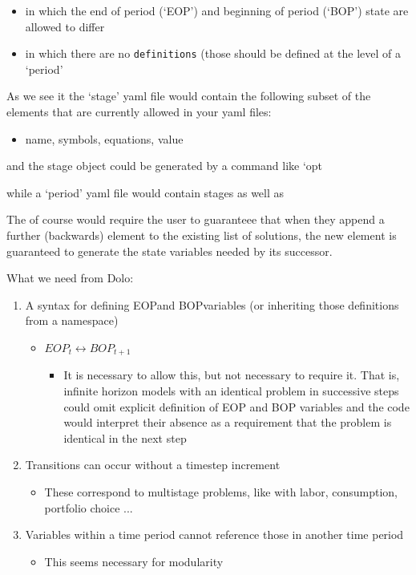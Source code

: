 \documentclass[\econtexRoot/BufferStockTheory]{subfiles}
\newcommand{\eop}{EOP}\newcommand{\bop}{BOP}
\begin{document}
\begin{itemize}
\item in which the end of period (`\eop') and beginning of period (`\bop') state are allowed to differ
\item in which there are no \texttt{definitions} (those should be defined at the level of a `period'
\end{itemize}


As we see it the `stage' yaml file would contain the following subset of the elements that are currently allowed in your yaml files:
\begin{itemize}
\item name, symbols, equations, value
  
\end{itemize}
and the stage object could be generated by a command like `opt

while a `period' yaml file would contain stages as well as 

The of course would require the user to guaranteee that when they append a further (backwards) element to the existing list of solutions, the new element is guaranteed to generate the state variables needed by its successor.

What we need from Dolo:
\begin{enumerate}
\item A syntax for defining \eop and \bop variables (or inheriting those definitions from a namespace)
  \begin{itemize}
  \item $\eop_{t} \leftrightarrow \bop_{t+1}$
    \begin{itemize}
    \item It is necessary to allow this, but not necessary to require it.  That is, infinite horizon models with an identical problem in successive steps could omit explicit definition of {\eop} and {\bop} variables and the code would interpret their absence as a requirement that the problem is identical in the next step
    \end{itemize}
  \end{itemize}
\item Transitions can occur without a timestep increment
  \begin{itemize}
  \item These correspond to multistage problems, like with labor, consumption, portfolio choice ...
  \end{itemize}
\item Variables within a time period cannot reference those in another time period
  \begin{itemize}
  \item This seems necessary for modularity
  \end{itemize}
\end{enumerate}
\hypertarget{ApndxSolutionSteps}{}
\end{document}
